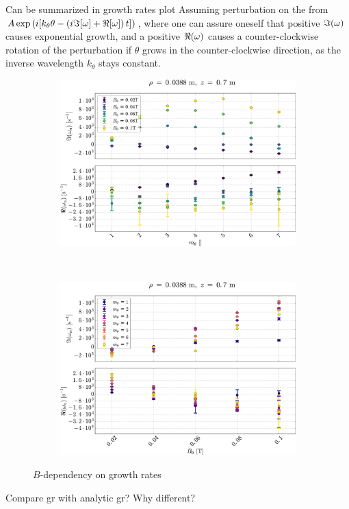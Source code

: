 %
Can be summarized in growth rates plot
Assuming perturbation on the from $A\exp\left(i[k_\theta \theta - \left(i\Im[\omega] + \Re[\omega]\right) t]\right)$, where one can assure oneself that positive $\Im(\omega)$ causes exponential growth, and a positive $\Re(\omega)$ causes a counter-clockwise rotation of the perturbation if $\theta$ grows in the counter-clockwise direction, as the inverse wavelength $k_\theta$ stays constant.
%
\begin{figure}[htbp]
    \centering
    \begin{subfigure}[h]{1.00\textwidth}
        \centering
        \includegraphics[width=1.0\textwidth]{fig/results/growthRates/growthRatesB0}
        \label{fig:grB}
    \end{subfigure}%
    \\
    \begin{subfigure}[h]{1.00\textwidth}
        \centering
        \includegraphics[width=1.0\textwidth]{fig/results/growthRates/growthRatesB0ModeNr}
        \label{fig:grBModeNr}
    \end{subfigure}
    \caption{$B$-dependency on growth rates}
\end{figure}
%
Compare gr with analytic gr?
Why different?

